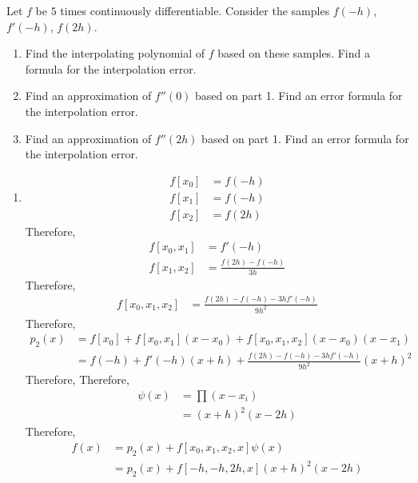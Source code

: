 \documentclass[fleqn, a4paper, 11pt, oneside, reqno]{amsart}
\theoremstyle{definition}
\theoremstyle{theorem}
\begin{document}
\begin{question}
	Let $f$ be $5$ times continuously differentiable.
	Consider the samples $f(-h)$, $f'(-h)$, $f(2 h)$.
	\begin{enumerate}
		\item
			Find the interpolating polynomial of $f$ based on these samples.
			Find a formula for the interpolation error.
		\item
			Find an approximation of $f''(0)$ based on part 1.
			Find an error formula for the interpolation error.
		\item
			Find an approximation of $f''(2 h)$ based on part 1.
			Find an error formula for the interpolation error.
	\end{enumerate}
\end{question}

\begin{solution}
	\begin{enumerate}[leftmargin=*]
		\item
			\begin{align*}
				f[x_0] & = f(-h) \\
				f[x_1] & = f(-h) \\
				f[x_2] & = f(2 h)
			\end{align*}
			Therefore,
			\begin{align*}
				f[x_0,x_1] & = f'(-h) \\
				f[x_1,x_2] & = \frac{f(2 h) - f(-h)}{3 h}
			\end{align*}
			Therefore,
			\begin{align*}
				f[x_0,x_1,x_2] & = \frac{f(2 h) - f(-h) - 3 h f'(-h)}{9 h^2}
			\end{align*}
			Therefore,
			\begin{align*}
				p_2(x) & = f[x_0] + f[x_0,x_1] (x - x_0) + f[x_0,x_1,x_2] (x - x_0) (x - x_1) \\
                                       & = f(-h) + f'(-h) (x + h) + \frac{f(2 h) - f(-h) - 3 h f'(-h)}{9 h^2} (x + h)^2
			\end{align*}
			Therefore,
			Therefore,
			\begin{align*}
				\psi(x) & = \prod (x - x_i) \\
                                        & = (x + h)^2 (x - 2 h)
			\end{align*}
			Therefore,
			\begin{align*}
				f(x) & = p_2(x) + f[x_0,x_1,x_2,x] \psi(x) \\
                                     & = p_2(x) + f[-h,-h,2 h,x] (x + h)^2 (x - 2 h)

\end{align*}
\end{enumerate}
\end{solution}
\end{document}
